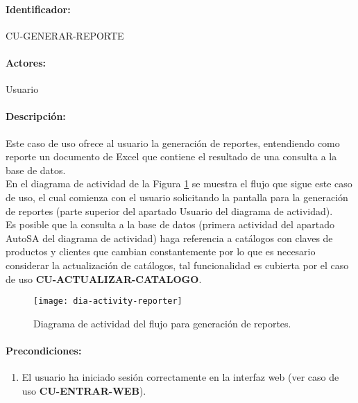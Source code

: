 \paragraph{Identificador:}
CU-GENERAR-REPORTE
\paragraph{Actores:}
Usuario
\paragraph{Descripción:}
Este caso de uso ofrece al usuario la generación de reportes, entendiendo como reporte un documento de Excel\textsuperscript{\textcopyright} que contiene el resultado de una consulta a la base de datos.\\
En el diagrama de actividad de la Figura \ref{fig:dia-activity-reporter} se muestra el flujo que sigue este caso de uso, el cual comienza con el usuario solicitando la pantalla para la generación de reportes (parte superior del apartado Usuario del diagrama de actividad).\\
Es posible que la consulta a la base de datos (primera actividad del apartado AutoSA del diagrama de actividad) haga referencia a catálogos con claves de productos y clientes que cambian constantemente por lo que es necesario considerar la actualización de catálogos, tal funcionalidad es cubierta por el caso de uso \textbf{CU-ACTUALIZAR-CATALOGO}.
\begin{figure}[h]
  \centering
  \texttt{[image: dia-activity-reporter]}
  \caption{Diagrama de actividad del flujo para generación de reportes.}
  \label{fig:dia-activity-reporter}
\end{figure}
\paragraph{Precondiciones:}
\begin{enumerate}
  \item El usuario ha iniciado sesión correctamente en la interfaz web (ver caso de uso \textbf{CU-ENTRAR-WEB}).
\end{enumerate}
